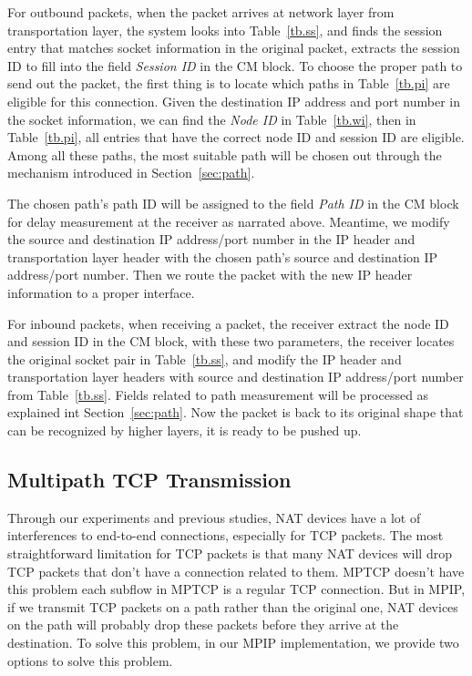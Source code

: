 For outbound packets, when the packet arrives at network layer from transportation layer, the system looks into Table~\ref{tb.ss}, and finds the session entry that matches socket information in the original packet, extracts the session ID to fill into the field \emph{Session ID} in the CM block. To choose the proper path to send out the packet, the first thing is to locate which paths in Table~\ref{tb.pi} are eligible for this connection. Given the destination IP address and port number in the socket information, we can find the \emph{Node ID} in Table~\ref{tb.wi}, then in Table~\ref{tb.pi}, all entries that have the correct node ID and session ID are eligible. Among all these paths, the most suitable path will be chosen out through the mechanism introduced in Section~\ref{sec:path}. 

The chosen path's path ID will be assigned to the field \emph{Path ID} in the CM block for delay measurement at the receiver as narrated above. Meantime, we modify the source and destination IP address/port number in the IP header and transportation layer header with the chosen path's source and destination IP address/port number. Then we route the packet with the new IP header information to a proper interface.

For inbound packets, when receiving a packet, the receiver extract the node ID and session ID in the CM block, with these two parameters, the receiver locates the original socket pair in Table~\ref{tb.ss}, and modify the IP header and transportation layer headers with source and destination IP address/port number from Table~\ref{tb.ss}. Fields related to path measurement will be processed as explained int Section~\ref{sec:path}. Now the packet is back to its original shape that can be recognized by higher layers, it is ready to be pushed up.


%

\subsection{Multipath TCP Transmission}
Through our experiments and previous studies\cite{mptcp}, NAT devices have a lot of interferences to end-to-end connections, especially for TCP packets. The most straightforward limitation for TCP packets is that many NAT devices will drop TCP packets that don't have a connection related to them. MPTCP doesn't have this problem each subflow in MPTCP is a regular TCP connection. But in MPIP, if we transmit TCP packets on a path rather than the original one, NAT devices on the path will probably drop these packets before they arrive at the destination. To solve this problem, in our MPIP implementation, we provide two options to solve this problem.

